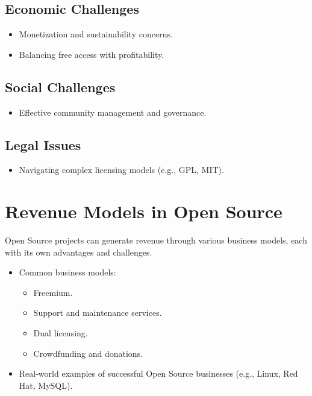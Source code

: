 \subsection{Economic Challenges}

\begin{itemize}
    \item Monetization and sustainability concerns.
    \item Balancing free access with profitability.
\end{itemize}
\subsection{Social Challenges}

\begin{itemize}
    \item Effective community management and governance.
\end{itemize}
\subsection{Legal Issues}

\begin{itemize}
    \item Navigating complex licensing models (e.g., GPL, MIT).
\end{itemize}

\section{Revenue Models in Open Source}

Open Source projects can generate revenue through various business models, each with its own advantages and challenges.

\begin{itemize}
    \item Common business models:
    \begin{itemize}
        \item Freemium.
        \item Support and maintenance services.
        \item Dual licensing.
        \item Crowdfunding and donations.
    \end{itemize}
    \item Real-world examples of successful Open Source businesses (e.g., Linux, Red Hat, MySQL).
\end{itemize}

